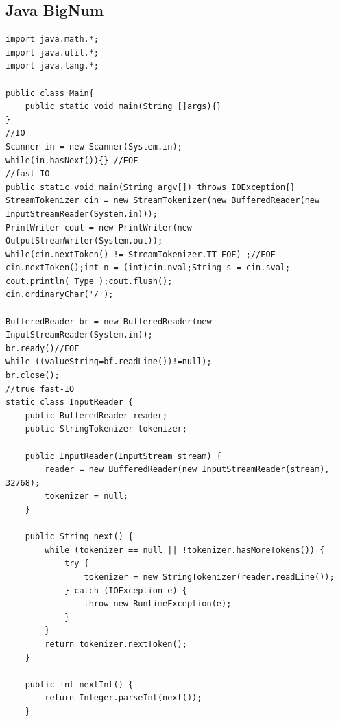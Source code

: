 \documentclass[10pt]{ctexart}
\begin{document}
{{\subsection{Java BigNum}
\begin{lstlisting}
import java.math.*;
import java.util.*;
import java.lang.*;

public class Main{
    public static void main(String []args){}
}
//IO
Scanner in = new Scanner(System.in);
while(in.hasNext()){} //EOF
//fast-IO
public static void main(String argv[]) throws IOException{}
StreamTokenizer cin = new StreamTokenizer(new BufferedReader(new InputStreamReader(System.in))); 
PrintWriter cout = new PrintWriter(new OutputStreamWriter(System.out));
while(cin.nextToken() != StreamTokenizer.TT_EOF) ;//EOF
cin.nextToken();int n = (int)cin.nval;String s = cin.sval;
cout.println( Type );cout.flush();
cin.ordinaryChar('/');

BufferedReader br = new BufferedReader(new InputStreamReader(System.in));
br.ready()//EOF
while ((valueString=bf.readLine())!=null);
br.close();
//true fast-IO
static class InputReader {
    public BufferedReader reader;
    public StringTokenizer tokenizer;
 
    public InputReader(InputStream stream) {
        reader = new BufferedReader(new InputStreamReader(stream), 32768);
        tokenizer = null;
    }
 
    public String next() {
        while (tokenizer == null || !tokenizer.hasMoreTokens()) {
            try {
                tokenizer = new StringTokenizer(reader.readLine());
            } catch (IOException e) {
                throw new RuntimeException(e);
            }
        }
        return tokenizer.nextToken();
    }
 
    public int nextInt() {
        return Integer.parseInt(next());
    }
 

\end{lstlisting}}}
\end{document}
